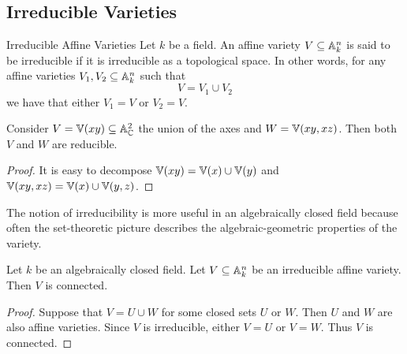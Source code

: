 \documentclass[a4paper]{article}
\begin{document}
\subsection{Irreducible Varieties}
\begin{defn}{Irreducible Affine Varieties}{} Let $k$ be a field. An affine variety $V\subseteq\mathbb{A}_k^n$ is said to be irreducible if it is irreducible as a topological space. In other words, for any affine varieties $V_1,V_2\subseteq\mathbb{A}_k^n$ such that $$V=V_1\cup V_2$$ we have that either $V_1=V$ or $V_2=V$. 
\end{defn}

\begin{eg}{}{} Consider $V=\mathbb{V}(xy)\subseteq\mathbb{A}_{\mathbb{C}}^2$ the union of the axes and $W=\mathbb{V}(xy,xz)$. Then both $V$ and $W$ are reducible. \tcbline
\begin{proof}
It is easy to decompose $\mathbb{V}(xy)=\mathbb{V}(x)\cup\mathbb{V}(y)$ and $\mathbb{V}(xy,xz)=\mathbb{V}(x)\cup\mathbb{V}(y,z)$. 
\end{proof}
\end{eg}

The notion of irreducibility is more useful in an algebraically closed field because often the set-theoretic picture describes the algebraic-geometric properties of the variety. 

\begin{prp}{}{} Let $k$ be an algebraically closed field. Let $V\subseteq\mathbb{A}_k^n$ be an irreducible affine variety. Then $V$ is connected. \tcbline
\begin{proof}
Suppose that $V=U\cup W$ for some closed sets $U$ or $W$. Then $U$ and $W$ are also affine varieties. Since $V$ is irreducible, either $V=U$ or $V=W$. Thus $V$ is connected. 
\end{proof}
\end{prp}
\end{document}
